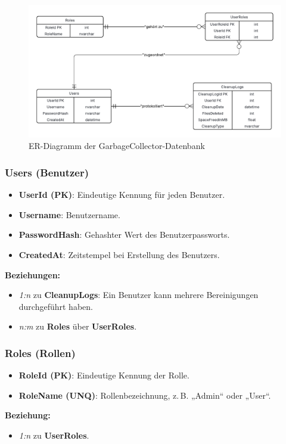 


\begin{figure}[H]
    \centering
    \includegraphics[width=\textwidth]{src/er_diagramm.pdf}
    \caption{ER-Diagramm der GarbageCollector-Datenbank}
\end{figure}


\setlength{\parskip}{0pt}
\setlength{\itemsep}{2pt}

\subsubsection*{Users (Benutzer)}
{\small
\begin{itemize}
    \item \textbf{UserId (PK)}: Eindeutige Kennung für jeden Benutzer.
    \item \textbf{Username}: Benutzername.
    \item \textbf{PasswordHash}: Gehashter Wert des Benutzerpassworts.
    \item \textbf{CreatedAt}: Zeitstempel bei Erstellung des Benutzers.
\end{itemize}
\textbf{Beziehungen:}
\begin{itemize}
    \item \textit{1:n} zu \textbf{CleanupLogs}: Ein Benutzer kann mehrere Bereinigungen durchgeführt haben.
    \item \textit{n:m} zu \textbf{Roles} über \textbf{UserRoles}.
\end{itemize}
}

\subsubsection*{Roles (Rollen)}
{\small
\begin{itemize}
    \item \textbf{RoleId (PK)}: Eindeutige Kennung der Rolle.
    \item \textbf{RoleName (UNQ)}: Rollenbezeichnung, z.\,B. „Admin“ oder „User“.
\end{itemize}
\textbf{Beziehung:}
\begin{itemize}
    \item \textit{1:n} zu \textbf{UserRoles}.
\end{itemize}
}

